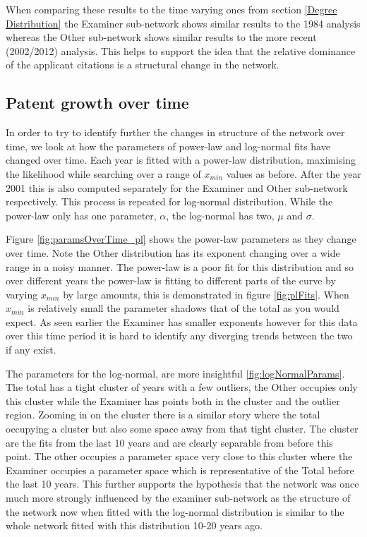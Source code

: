 When comparing these results to the time varying ones from section \ref{Degree Distribution} the Examiner sub-network shows similar results to the 1984 analysis whereas the Other sub-network shows similar results to the more recent (2002/2012) analysis. This helps to support the idea that the relative dominance of the applicant citations is a structural change in the network. 


\subsection{Patent growth over time}

In order to try to identify further the changes in structure of the network over time, we look at how the parameters of power-law and log-normal fits have changed over time. Each year is fitted with a power-law distribution, maximising the likelihood while searching over a range of $x_{min}$ values as before. After the year 2001 this is also computed separately for the Examiner and Other sub-network respectively. This process is repeated for log-normal distribution. While the power-law only has one parameter, $\alpha$, the log-normal has two, $\mu$ and $\sigma$. 

Figure \ref{fig:paramsOverTime_pl} shows the power-law parameters as they change over time. Note the Other distribution has its exponent changing over a wide range in a noisy manner. The power-law is a poor fit for this distribution and so over different years the power-law is fitting to different parts of the curve by varying $x_{min}$ by large amounts, this is demonstrated in figure \ref{fig:plFits}. When $x_{min}$ is relatively small the parameter shadows that of the total as you would expect. As seen earlier the Examiner has smaller exponents however for this data over this time period it is hard to identify any diverging trends between the two if any exist. 

The parameters for the log-normal, are more insightful \ref{fig:logNormalParams}. The total has a tight cluster of years with a few outliers, the Other occupies only this cluster while the Examiner has points both in the cluster and the outlier region. Zooming in on the cluster there is a similar story where the total occupying a cluster but also some space away from that tight cluster. The cluster are the fits from the last 10 years and are clearly separable from before this point. The other occupies a parameter space very close to this cluster where the Examiner occupies a parameter space which is representative of the Total before the last 10 years. This further supports the hypothesis that the network was once much more strongly influenced by the examiner sub-network as the structure of the network now when fitted with the log-normal distribution is similar to the whole network fitted with this distribution 10-20 years ago.  

